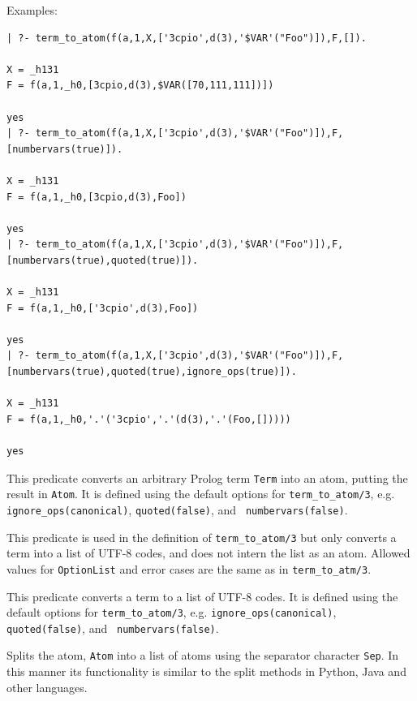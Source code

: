 \begin{description}
Examples:
{\footnotesize
\begin{verbatim}
| ?- term_to_atom(f(a,1,X,['3cpio',d(3),'$VAR'("Foo")]),F,[]).

X = _h131
F = f(a,1,_h0,[3cpio,d(3),$VAR([70,111,111])])

yes
| ?- term_to_atom(f(a,1,X,['3cpio',d(3),'$VAR'("Foo")]),F,[numbervars(true)]).

X = _h131
F = f(a,1,_h0,[3cpio,d(3),Foo])

yes
| ?- term_to_atom(f(a,1,X,['3cpio',d(3),'$VAR'("Foo")]),F,[numbervars(true),quoted(true)]).

X = _h131
F = f(a,1,_h0,['3cpio',d(3),Foo])

yes
| ?- term_to_atom(f(a,1,X,['3cpio',d(3),'$VAR'("Foo")]),F,[numbervars(true),quoted(true),ignore_ops(true)]).

X = _h131
F = f(a,1,_h0,'.'('3cpio','.'(d(3),'.'(Foo,[]))))

yes
\end{verbatim}}

%
This predicate converts an arbitrary Prolog term {\tt Term} into an
atom, putting the result in {\tt Atom}.  It is defined using the
default options for {\tt term\_to\_atom/3}, e.g. {\tt
ignore\_ops(canonical)}, {\tt quoted(false)}, and {\tt
numbervars(false)}.

%
This predicate is used in the definition of {\tt term\_to\_atom/3} but
only converts a term into a list of UTF-8 codes, and does not intern
the list as an atom.  Allowed values for {\tt OptionList} and error
cases are the same as in {\tt term\_to\_atm/3}.

%
This predicate converts a term to a list of UTF-8 codes.  It is
defined using the default options for {\tt term\_to\_atom/3},
e.g. {\tt ignore\_ops(canonical)}, {\tt quoted(false)}, and {\tt
  numbervars(false)}.

%
Splits the atom, {\tt Atom} into a list of atoms using the separator
character {\tt Sep}.  In this manner its functionality is similar to
the split methods in Python, Java and other languages.


\end{description}
